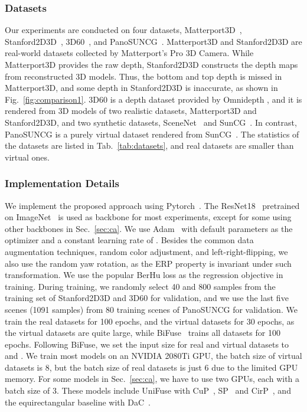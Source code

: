 \documentclass[letterpaper, 10 pt, conference]{ieeeconf}
\begin{document}
\subsubsection{Datasets}
Our experiments are conducted on four datasets, Matterport3D~\cite{Matterport3D}, Stanford2D3D~\cite{armeni2017joint}, 3D60~\cite{zioulis2018omnidepth}, and PanoSUNCG~\cite{wang2018self}. Matterport3D and Stanford2D3D are real-world datasets collected by Matterport’s Pro 3D Camera. While Matterport3D provides the raw depth, Stanford2D3D constructs the depth maps from reconstructed 3D models. Thus, the bottom and top depth is missed in Matterport3D, and some depth in Stanford2D3D is inaccurate, as shown in Fig.~\ref{fig:comparison1}. 3D60 is a  depth dataset provided by Omnidepth \cite{zioulis2018omnidepth}, and it is rendered from 3D models of two realistic datasets, Matterport3D and Stanford2D3D, and two synthetic datasets, SceneNet~\cite{handa2016scenenet} and SunCG~\cite{song2017semantic}. In contrast, PanoSUNCG is a purely virtual dataset rendered from SunCG~\cite{song2017semantic}. The statistics of the  datasets are listed in Tab.~\ref{tab:datasets}, and real datasets are smaller than virtual ones. 


\subsubsection{Implementation Details}
We implement the proposed approach using Pytorch~\cite{paszke2017automatic}. 
The ResNet18~\cite{he2016deep} pretrained on ImageNet~\cite{deng2009imagenet} is used as backbone for most experiments, except for some using other backbones in Sec.~\ref{sec:ca}.
We use Adam~\cite{kingma2014adam} with default parameters as the optimizer and a constant learning rate of . 
Besides the common data augmentation techniques, random color adjustment, and left-right-flipping, we also use the random yaw rotation, as the ERP property is invariant under such transformation. 
We use the popular BerHu loss \cite{laina2016deeper} as the regression objective in training. 
During training, we randomly select 40 and 800 samples from the training set of Stanford2D3D and 3D60 for validation, and we use the last five scenes (1091 samples) from 80 training scenes of PanoSUNCG for validation. 
We train the real datasets for 100 epochs, and the virtual datasets for 30 epochs, as the virtual datasets are quite large, while BiFuse~\cite{wang2020bifuse} trains all datasets for 100 epochs. 
Following BiFuse, we set the input size for real and virtual datasets to  and . We train most models on an NVIDIA 2080Ti GPU, the batch size of virtual datasets is 8, but the batch size of real datasets is just 6 due to the limited GPU memory. {For some models in Sec.~\ref{sec:ca}, we have to use two GPUs, each with a batch size of 3. These models include UniFuse with CuP~\cite{cheng2018cube}, SP~\cite{wang2020bifuse} and CirP~\cite{wang2018omnidirectional}, and the equirectangular baseline with DaC~\cite{coors2018spherenet}.}
\end{document}
